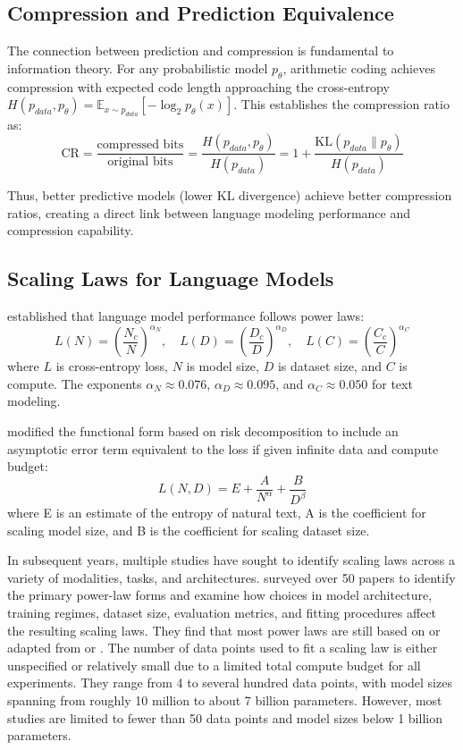 \documentclass[11pt]{article}
\begin{document}
\subsection{Compression and Prediction Equivalence}

The connection between prediction and compression is fundamental to information theory. For any probabilistic model $p_\theta$, arithmetic coding achieves compression with expected code length approaching the cross-entropy $H(p_{data}, p_\theta) = \mathbb{E}_{x \sim p_{data}}[-\log_2 p_\theta(x)]$. This establishes the compression ratio as:
\[
\mathrm{CR} = \frac{\text{compressed bits}}{\text{original bits}} = \frac{H(p_{data}, p_\theta)}{H(p_{data})} = 1 + \frac{\mathrm{KL}(p_{data} \parallel p_\theta)}{H(p_{data})}
\]

Thus, better predictive models (lower KL divergence) achieve better compression ratios, creating a direct link between language modeling performance and compression capability.

\subsection{Scaling Laws for Language Models}

\citet{kaplan2020scaling} established that language model performance follows power laws:
\[
L(N) = \left(\frac{N_c}{N}\right)^{\alpha_N}, \quad L(D) = \left(\frac{D_c}{D}\right)^{\alpha_D}, \quad L(C) = \left(\frac{C_c}{C}\right)^{\alpha_C}
\]
where $L$ is cross-entropy loss, $N$ is model size, $D$ is dataset size, and $C$ is compute. The exponents $\alpha_N \approx 0.076$, $\alpha_D \approx 0.095$, and $\alpha_C \approx 0.050$ for text modeling.

\citet{hoffmann2022scaling} modified the functional form based on risk decomposition to include an asymptotic error term equivalent to the loss if given infinite data and compute budget:
\[
L(N, D) = E + \frac{A}{N^\alpha} + \frac{B}{D^\beta}
\]
where E is an estimate of the entropy of natural text, A is the coefficient for scaling model size, and B is the coefficient for scaling dataset size.

In subsequent years, multiple studies have sought to identify scaling laws across a variety of modalities, tasks, and architectures. \citet{li2025scaling} surveyed over 50 papers to identify the primary power-law forms and examine how choices in model architecture, training regimes, dataset size, evaluation metrics, and fitting procedures affect the resulting scaling laws. They find that most power laws are still based on or adapted from \citet{kaplan2020scaling} or \citet{hoffmann2022scaling}. The number of data points used to fit a scaling law is either unspecified or relatively small due to a limited total compute budget for all experiments. They range from 4 to several hundred data points, with model sizes spanning from roughly 10 million to about 7 billion parameters. However, most studies are limited to fewer than 50 data points and model sizes below 1 billion parameters.
\end{document}
